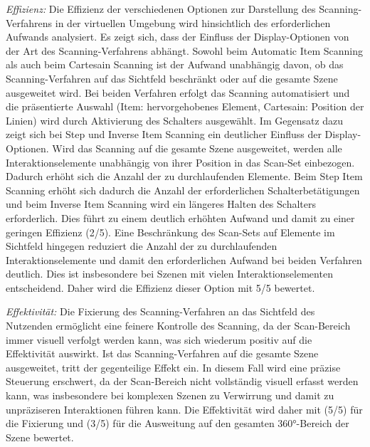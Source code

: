 \textit{Effizienz:}
Die Effizienz der verschiedenen Optionen zur Darstellung des Scanning-Verfahrens in der virtuellen Umgebung wird hinsichtlich des erforderlichen Aufwands analysiert. Es zeigt sich, dass der Einfluss der Display-Optionen von der Art des Scanning-Verfahrens abhängt.
Sowohl beim Automatic Item Scanning als auch beim Cartesain Scanning ist der Aufwand unabhängig davon, ob das Scanning-Verfahren auf das Sichtfeld beschränkt oder auf die gesamte Szene ausgeweitet wird. Bei beiden Verfahren erfolgt das Scanning automatisiert und die präsentierte Auswahl (Item: hervorgehobenes Element, Cartesain: Position der Linien) wird durch Aktivierung des Schalters ausgewählt. Im Gegensatz dazu zeigt sich bei Step und Inverse Item Scanning ein deutlicher Einfluss der Display-Optionen. Wird das Scanning auf die gesamte Szene ausgeweitet, werden alle Interaktionselemente unabhängig von ihrer Position in das Scan-Set einbezogen. Dadurch erhöht sich die Anzahl der zu durchlaufenden Elemente. Beim Step Item Scanning erhöht sich dadurch die Anzahl der erforderlichen Schalterbetätigungen und beim Inverse Item Scanning wird ein längeres Halten des Schalters erforderlich. Dies führt zu einem deutlich erhöhten Aufwand und damit zu einer geringen Effizienz (2/5). Eine Beschränkung des Scan-Sets auf Elemente im Sichtfeld hingegen reduziert die Anzahl der zu durchlaufenden Interaktionselemente und damit den erforderlichen Aufwand bei beiden Verfahren deutlich. Dies ist insbesondere bei Szenen mit vielen Interaktionselementen entscheidend. Daher wird die Effizienz dieser Option mit 5/5 bewertet. 

\textit{Effektivität:}
Die Fixierung des Scanning-Verfahren an das Sichtfeld des Nutzenden ermöglicht eine feinere Kontrolle des Scanning, da der Scan-Bereich immer visuell verfolgt werden kann, was sich wiederum positiv auf die Effektivität auswirkt. Ist das Scanning-Verfahren auf die gesamte Szene ausgeweitet, tritt der gegenteilige Effekt ein. In diesem Fall wird eine präzise Steuerung erschwert, da der Scan-Bereich nicht vollständig visuell erfasst werden kann, was insbesondere bei komplexen Szenen zu Verwirrung und damit zu unpräziseren Interaktionen führen kann. Die Effektivität wird daher mit (5/5) für die Fixierung und (3/5) für die Ausweitung auf den gesamten 360°-Bereich der Szene bewertet. 

